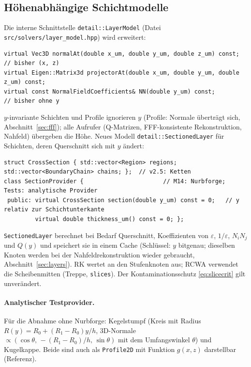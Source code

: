 \subsection{Höhenabhängige Schichtmodelle}
Die interne Schnittstelle \verb|detail::LayerModel| (Datei \verb|src/solvers/layer_model.hpp|) wird erweitert:
{\footnotesize\begin{verbatim}
virtual Vec3D normalAt(double x_um, double y_um, double z_um) const;          // bisher (x, z)
virtual Eigen::Matrix3d projectorAt(double x_um, double y_um, double z_um) const;
virtual const NormalFieldCoefficients& NN(double y_um) const;                // bisher ohne y
\end{verbatim}}
$y$-invariante Schichten und Profile ignorieren $y$ (Profile: Normale überträgt sich, Abschnitt~\ref{sec:fff});
alle Aufrufer (Q-Matrizen, FFF-konsistente Rekonstruktion, Nahfeld) übergeben die Höhe. Neues Modell
\verb|detail::SectionedLayer| für Schichten, deren Querschnitt sich mit $y$ ändert:
{\footnotesize\begin{verbatim}
struct CrossSection { std::vector<Region> regions; std::vector<BoundaryChain> chains; };  // v2.5: Ketten
class SectionProvider {                       // M14: Nurbforge; Tests: analytische Provider
 public: virtual CrossSection section(double y_um) const = 0;   // y relativ zur Schichtunterkante
         virtual double thickness_um() const = 0; };
\end{verbatim}}
\verb|SectionedLayer| berechnet bei Bedarf Querschnitt, Koeffizienten von $\varepsilon$, $1/\varepsilon$, $N_iN_j$
und $Q(y)$ und speichert sie in einem Cache (Schlüssel: $y$ bitgenau; dieselben Knoten werden bei der Nahfeldrekonstruktion
wieder gebraucht, Abschnitt~\ref{sec:layers}). RK wertet an den Stufenknoten aus; RCWA verwendet die Scheibenmitten
(Treppe, \verb|slices|). Der Kontaminationsschutz \eqref{eq:slicecrit} gilt unverändert.

\paragraph{Analytischer Testprovider.} Für die Abnahme ohne Nurbforge: Kegelstumpf (Kreis mit Radius
$R(y)=R_0+(R_1-R_0)y/h$, 3D-Normale $\propto(\cos\theta,\,-(R_1-R_0)/h,\,\sin\theta)$ mit dem Umfangswinkel $\theta$)
und Kugelkappe. Beide sind auch als \verb|Profile2D| mit Funktion $g(x,z)$ darstellbar (Referenz).

